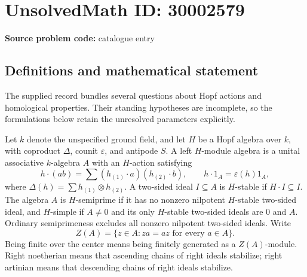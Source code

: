 \documentclass[11pt]{article}
\begin{document}
\section*{UnsolvedMath ID: 30002579}
\textbf{Source problem code:} catalogue entry
\subsection{Definitions and mathematical statement}
The supplied record bundles several questions about Hopf actions and homological properties. Their standing hypotheses are incomplete, so the formulations below retain the unresolved parameters explicitly.

Let \(k\) denote the unspecified ground field, and let \(H\) be a Hopf algebra over \(k\), with coproduct \(\Delta\), counit \(\varepsilon\), and antipode \(S\). A left \(H\)-module algebra is a unital associative \(k\)-algebra \(A\) with an \(H\)-action satisfying
\[
 h\cdot(ab)=\sum (h_{(1)}\cdot a)(h_{(2)}\cdot b),\qquad h\cdot1_A=\varepsilon(h)1_A,
\]
where \(\Delta(h)=\sum h_{(1)}\otimes h_{(2)}\). A two-sided ideal \(I\subseteq A\) is \(H\)-stable if \(H\cdot I\subseteq I\). The algebra \(A\) is \(H\)-semiprime if it has no nonzero nilpotent \(H\)-stable two-sided ideal, and \(H\)-simple if \(A\ne0\) and its only \(H\)-stable two-sided ideals are \(0\) and \(A\). Ordinary semiprimeness excludes all nonzero nilpotent two-sided ideals. Write
\[
 Z(A)=\{z\in A:za=az\text{ for every }a\in A\}.
\]
Being finite over the center means being finitely generated as a \(Z(A)\)-module. Right noetherian means that ascending chains of right ideals stabilize; right artinian means that descending chains of right ideals stabilize.
\end{document}
